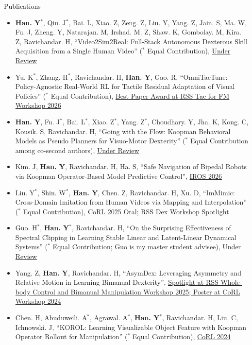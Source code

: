 \documentclass{resume} %
\begin{document}
\begin{rSection}{Publications}
\begin{itemize}
    \item \textbf{Han. Y}$^*$, Qiu. J$^*$, Bai. L, Xiao. Z, Zeng. Z, Liu. Y, Yang. Z, Jain. S, Ma. W, Fu. J, Zheng. Y, Natarajan. M, Irshad. M. Z, Shaw. K, Gombolay. M, Kira. Z, Ravichandar. H, ``Video2Sim2Real: Full-Stack Autonomous Dexterous Skill Acquisition from a Single Human Video'' ($^*$ Equal Contribution), \href{https://arxiv.org/abs/2606.08828}{Under Review}
    \item Yu. K$^*$, Zhang. H$^*$, Ravichandar. H, \textbf{Han. Y}, Gao. R, ``OmniTacTune: Policy-Agnostic Real-World RL for Tactile Residual Adaptation of Visual Policies'' ($^*$ Equal Contribution), \href{https://arxiv.org/abs/2607.03723}{Best Paper Award at RSS Tac for FM Workshop 2026}
    \item \textbf{Han. Y}, Fu. J$^*$, Bai. L$^*$, Xiao. Z$^*$, Yang. Z$^*$, Choudhary. Y, Jha. K, Kong. C, Kousik. S, Ravichandar. H, ``Going with the Flow: Koopman Behavioral Models as Pseudo Planners for Visuo-Motor Dexterity'' ($^*$ Equal Contribution among co-second authors), \href{https://arxiv.org/abs/2602.07413}{Under Review}
    \item Kim. J, \textbf{Han. Y}, Ravichandar. H, Ha. S, ``Safe Navigation of Bipedal Robots via Koopman Operator-Based Model Predictive Control'', \href{https://arxiv.org/abs/2409.14736}{IROS 2026}
    \item Liu. Y$^*$, Shin. W$^*$, \textbf{Han. Y}, Chen. Z, Ravichandar. H, Xu. D, ``ImMimic: Cross-Domain Imitation from Human Videos via Mapping and Interpolation'' ($^*$ Equal Contribution), \href{https://arxiv.org/abs/2509.10952}{CoRL 2025 Oral; RSS Dex Workshop Spotlight}
    \item Guo. H$^*$, \textbf{Han. Y}$^*$, Ravichandar. H, ``On the Surprising Effectiveness of Spectral Clipping in Learning Stable Linear and Latent-Linear Dynamical Systems'' ($^*$ Equal Contribution; Guo is my master student advisee), \href{https://arxiv.org/abs/2412.01168}{Under Review}
    \item Yang. Z, \textbf{Han. Y}, Ravichandar. H, ``AsymDex: Leveraging Asymmetry and Relative Motion in Learning Bimanual Dexterity'', \href{https://openreview.net/forum?id=g3vjZtYfMb}{Spotlight at RSS Whole-body Control and Bimanual Manipulation Workshop 2025; Poster at CoRL Workshop 2024}
    \item Chen. H, Abuduweili. A$^*$, Agrawal. A$^*$, \textbf{Han. Y}$^*$, Ravichandar. H, Liu. C, Ichnowski. J, ``KOROL: Learning Visualizable Object Feature with Koopman Operator Rollout for Manipulation'' ($^*$ Equal Contribution), \href{https://arxiv.org/abs/2407.00548}{CoRL 2024}

\end{itemize}
\end{rSection}
\end{document}
